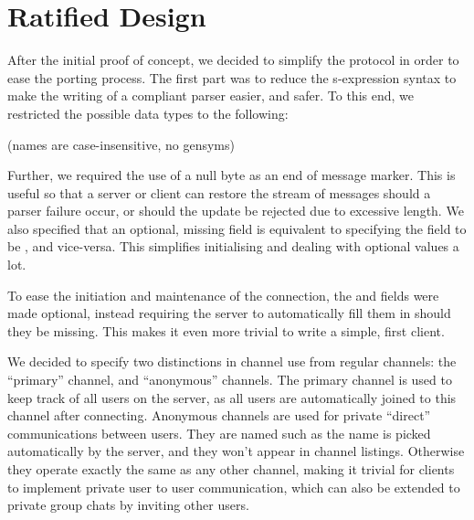 \documentclass[format=sigconf]{acmart}
\begin{document}
\section{Ratified Design}\label{ratified-design}
After the initial proof of concept, we decided to simplify the protocol in order to ease the porting process. The first part was to reduce the s-expression syntax to make the writing of a compliant parser easier, and safer. To this end, we restricted the possible data types to the following:

\begin{step}
\item {}
  \begin{step}
  \item {}
  \item {}
  \end{step}
\item {} (names are case-insensitive, no gensyms)
  \begin{step}
  \item {}
  \item {}
  \end{step}
\item {}
\item {}
\end{step}

Further, we required the use of a null byte as an end of message marker. This is useful so that a server or client can restore the stream of messages should a parser failure occur, or should the update be rejected due to excessive length. We also specified that an optional, missing field is equivalent to specifying the field to be , and vice-versa. This simplifies initialising and dealing with optional values a lot.

To ease the initiation and maintenance of the connection, the  and  fields were made optional, instead requiring the server to automatically fill them in should they be missing. This makes it even more trivial to write a simple, first client.

We decided to specify two distinctions in channel use from regular channels: the ``primary'' channel, and ``anonymous'' channels. The primary channel is used to keep track of all users on the server, as all users are automatically joined to this channel after connecting. Anonymous channels are used for private ``direct'' communications between users. They are named such as the name is picked automatically by the server, and they won't appear in channel listings. Otherwise they operate exactly the same as any other channel, making it trivial for clients to implement private user to user communication, which can also be extended to private group chats by inviting other users.
\end{document}
